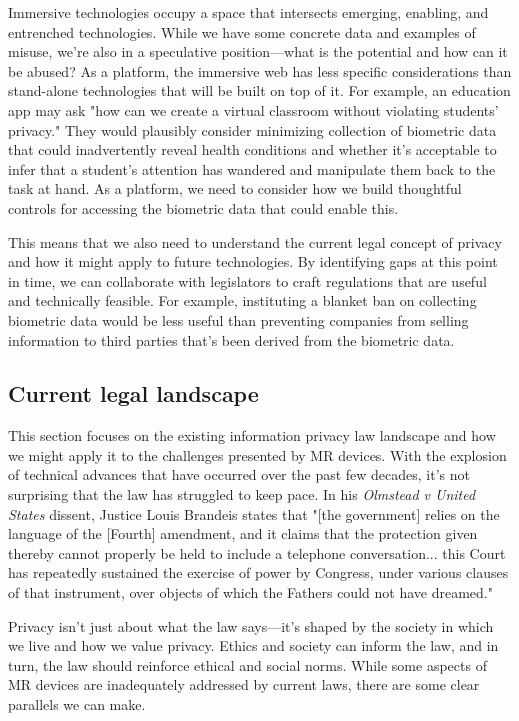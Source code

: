 Immersive technologies occupy a space that intersects emerging, enabling, and entrenched technologies. While we have some concrete data and examples of misuse, we're also in a speculative position---what is the potential and how can it be abused? As a platform, the immersive web has less specific considerations than stand-alone technologies that will be built on top of it. For example, an education app may ask "how can we create a virtual classroom without violating students' privacy." They would plausibly consider minimizing collection of biometric data that could inadvertently reveal health conditions and whether it's acceptable to infer that a student's attention has wandered and manipulate them back to the task at hand. As a platform, we need to consider how we build thoughtful controls for accessing the biometric data that could enable this.

This means that we also need to understand the current legal concept of privacy and how it might apply to future technologies. By identifying gaps at this point in time, we can collaborate with legislators to craft regulations that are useful and technically feasible. For example, instituting a blanket ban on collecting biometric data would be less useful than preventing companies from selling information to third parties that's been derived from the biometric data.

\subsection{Current legal landscape}\label{sec:laws}

This section focuses on the existing information privacy law landscape and how we might apply it to the challenges presented by MR devices. With the explosion of technical advances that have occurred over the past few decades, it's not surprising that the law has struggled to keep pace. In his \emph{Olmstead v United States} dissent, Justice Louis Brandeis states that "[the government] relies on the language of the [Fourth] amendment, and it claims that the protection given thereby cannot properly be held to include a telephone conversation... this Court has repeatedly sustained the exercise of power by Congress, under various clauses of that instrument, over objects of which the Fathers could not have dreamed."

Privacy isn't just about what the law says---it's shaped by the society in which we live and how we value privacy. Ethics and society can inform the law, and in turn, the law should reinforce ethical and social norms. While some aspects of MR devices are inadequately addressed by current laws, there are some clear parallels we can make.

